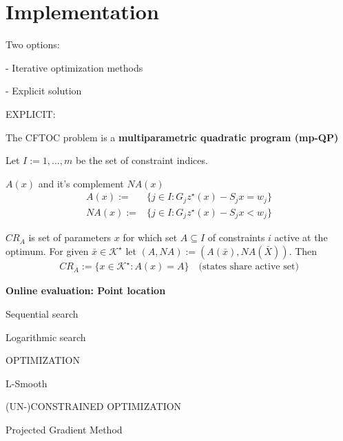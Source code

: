 \section{Implementation}

Two options:

- Iterative optimization methods

- Explicit solution

EXPLICIT:

The CFTOC problem is a
\textbf{multiparametric quadratic program (mp-QP)}


Let $I := {1, . . . , m}$ be the set of constraint indices.
\begin{definition}
	$A(x)$ and it's complement $NA(x)$
	\begin{align*}
		A(x) :=  & \{j\in I: G_jz^\star(x) - S_jx = w_j \} \\
		NA(x) := & \{j\in I: G_jz^\star(x) - S_jx < w_j \}
	\end{align*}
\end{definition}

\begin{definition}
	$CR_A$ is set of parameters $x$ for which set $A\subseteq I$ of constraints $i$ active at the optimum.
	For given $\bar{x} \in \mathcal{K}^\star$ let $(A,NA) := (A(\bar{x}), NA(\bar{X}))$. Then
	\begin{align*}
		CR_A := \{x\in\mathcal{K}^\star : A(x) = A\} \quad \text{(states share active set)}
	\end{align*}
\end{definition}

\textbf{Online evaluation: Point location}

Sequential search

Logarithmic search

OPTIMIZATION



L-Smooth

(UN-)CONSTRAINED OPTIMIZATION

Projected Gradient Method %





